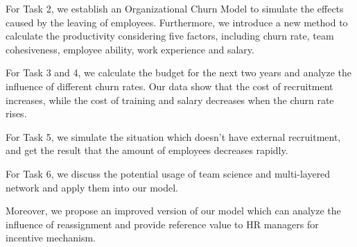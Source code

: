 \documentclass[12pt,a4paper,titlepage]{article}
\begin{document}
For Task 2, we establish an Organizational Churn Model to simulate the
effects caused by the leaving of employees. Furthermore, we introduce
a new method to calculate the productivity considering five factors,
including churn rate, team cohesiveness, employee ability, work
experience and salary.

For Task 3 and 4, we calculate the budget for the next two years and
analyze the influence of different churn rates. Our data show that the
cost of recruitment increases, while the cost of training and salary
decreases when the churn rate rises.

For Task 5, we simulate the situation which doesn't have external
recruitment, and get the result that the amount of employees decreases
rapidly.

For Task 6, we discuss the potential usage of team science and
multi-layered network and apply them into our model.

Moreover, we propose an improved version of our model which can
analyze the influence of reassignment and provide reference value to
HR managers for incentive mechanism.
\end{document}
